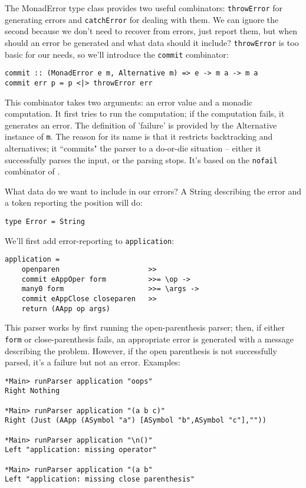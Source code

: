 \documentclass{tmr}
\begin{document}
The MonadError type class provides two useful combinators: \verb+throwError+ for 
generating errors and \verb+catchError+ for dealing with them.  We can ignore 
the second because we don't need to recover from errors, just report them, 
but when should an error be generated and what 
data should it include?  \verb+throwError+ is too basic for our needs, so we'll 
introduce the \verb+commit+ combinator:
\begin{verbatim}
commit :: (MonadError e m, Alternative m) => e -> m a -> m a
commit err p = p <|> throwError err
\end{verbatim}

This combinator takes two arguments: an error value and a monadic 
computation.  It first tries to run the computation; if the computation 
fails, it generates an error.  The 
definition of 'failure' is provided by the Alternative instance of \verb+m+.
The reason for its name is that it restricts backtracking and alternatives;
it ``commits" the parser to a do-or-die situation -- either it successfully
parses the input, or the parsing stops.  It's based on the \verb+nofail+
combinator of \cite{hutton1992higher}.

What data do we want to include in our errors?  A String describing the error 
and a token reporting the position will do:
\begin{verbatim}
type Error = String
\end{verbatim}

We'll first add error-reporting to \verb+application+:
\begin{verbatim}
application =
    openparen                     >>
    commit eAppOper form          >>= \op ->
    many0 form                    >>= \args ->
    commit eAppClose closeparen   >>
    return (AApp op args)
\end{verbatim}

This parser works by first running the open-parenthesis parser; then, if either 
\verb+form+ or close-parenthesis fails, an appropriate error is generated with 
a message describing the problem.  However, if the open 
parenthesis is not successfully parsed, it's a failure but not an error.  
Examples:
\begin{verbatim}
*Main> runParser application "oops"
Right Nothing

*Main> runParser application "(a b c)"
Right (Just (AApp (ASymbol "a") [ASymbol "b",ASymbol "c"],""))

*Main> runParser application "\n()"
Left "application: missing operator"

*Main> runParser application "(a b"
Left "application: missing close parenthesis"
\end{verbatim}
\end{document}
